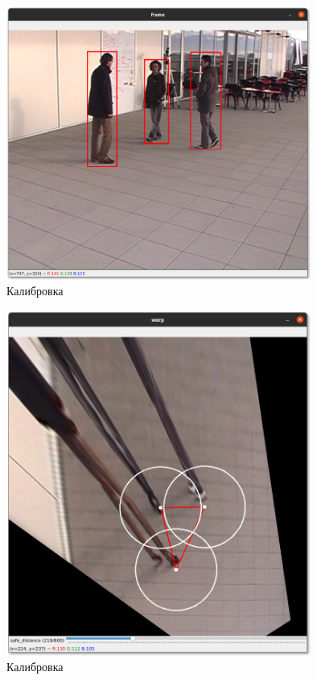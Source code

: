 \begin{figure}[H]
    \centering
    \includegraphics[width=10cm]{images/danger1.png}
    \caption{Калибровка}
    \label{<label>}
\end{figure}

\begin{figure}[H]
    \centering
    \includegraphics[width=10cm]{images/danger2.png}
    \caption{Калибровка}
    \label{<label>}
\end{figure}
